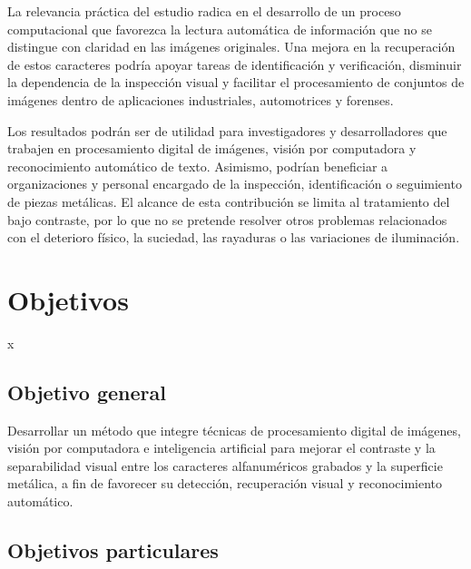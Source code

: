 La relevancia práctica del estudio radica en el desarrollo de un proceso computacional que favorezca la lectura automática de información que no se distingue con claridad en las imágenes originales. Una mejora en la recuperación de estos caracteres podría apoyar tareas de identificación y verificación, disminuir la dependencia de la inspección visual y facilitar el procesamiento de conjuntos de imágenes dentro de aplicaciones industriales, automotrices y forenses.

Los resultados podrán ser de utilidad para investigadores y desarrolladores que trabajen en procesamiento digital de imágenes, visión por computadora y reconocimiento automático de texto. Asimismo, podrían beneficiar a organizaciones y personal encargado de la inspección, identificación o seguimiento de piezas metálicas. El alcance de esta contribución se limita al tratamiento del bajo contraste, por lo que no se pretende resolver otros problemas relacionados con el deterioro físico, la suciedad, las rayaduras o las variaciones de iluminación.

\section{Objetivos}x
\label{sec:objetivos}

\subsection{Objetivo general}
\label{subsec:objetivo_general}

Desarrollar un método que integre técnicas de procesamiento digital de imágenes, visión por computadora e inteligencia artificial para mejorar el contraste y la separabilidad visual entre los caracteres alfanuméricos grabados y la superficie metálica, a fin de favorecer su detección, recuperación visual y reconocimiento automático.


\subsection{Objetivos particulares}
\label{subsec:objetivos_particulares}

